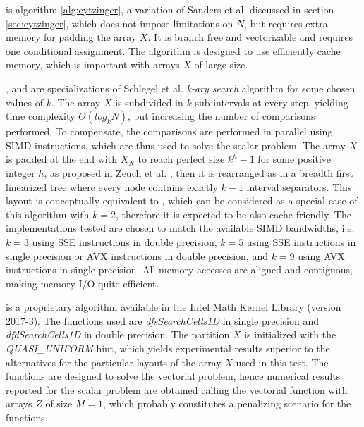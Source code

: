 \documentclass[preprint,1p,times]{elsarticle}
\begin{document}
\begin{myitemize}
		\item \textit{\EytzingerName} is algorithm \ref{alg:eytzinger}, a variation of Sanders et al. \cite{Sanders2004} discussed in section \ref{sec:eytzinger}, which does not impose limitations on $N$, but requires extra memory for padding the array $X$. It is branch free and vectorizable and requires one conditional assignment. The algorithm is designed to use efficiently cache memory, which is important with arrays $X$ of large size.
		\item \textit{\TernaryName}, \textit{\PentaryName} and \textit{\NonaryName} are specializations of Schlegel et al. \cite{kary2009} \textit{k-ary search} algorithm for some chosen values of $k$. The array $X$ is subdivided in $k$ sub-intervals at every step, yielding time complexity $O(log_k N)$, but increasing the number of comparisons performed. To compensate, the comparisons are performed in parallel using SIMD instructions, which are thus used to solve the scalar problem. The array $X$ is padded at the end with $X_N$ to reach perfect size $k^h-1$ for some positive integer $h$, as proposed in Zeuch et al. \cite{kary2014}, then it is rearranged as in a breadth first linearized tree where every node contains exactly $k-1$ interval separators. This layout is conceptually equivalent to \textit{\EytzingerName}, which can be considered as a special case of this algorithm with $k=2$, therefore it is expected to be also cache friendly. The implementations tested are chosen to match the available SIMD bandwidths, i.e. $k=3$ using SSE instructions in double precision, $k=5$ using SSE instructions in single precision or AVX instructions in double precision, and $k=9$ using AVX instructions in single precision. All memory accesses are aligned and contiguous, making memory I/O quite efficient.
	\item \textit{\MKLName} is a proprietary algorithm available in the Intel Math Kernel Library (version 2017-3). The functions used are \textit{dfsSearchCells1D} in single precision and \textit{dfdSearchCells1D} in double precision. The partition $X$ is initialized with the \textit{QUASI\_UNIFORM} hint, which yields experimental results superior to the alternatives for the particular layouts of the array $X$ used in this test. The functions are designed to solve the vectorial problem, hence numerical results reported for the scalar problem are obtained calling the vectorial function with arrays $Z$ of size $M=1$, which probably constitutes a penalizing scenario for the functions.
\end{myitemize}
\end{document}

